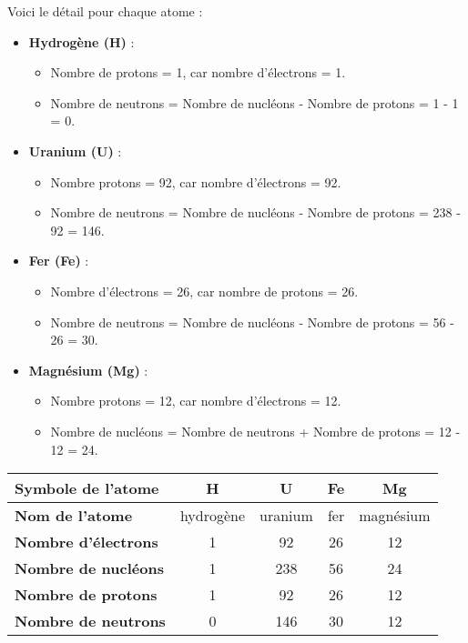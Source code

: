 \documentclass{exam}
\begin{document}
\begin{questions}
Voici le détail pour chaque atome :

\begin{itemize}
  \item \textbf{Hydrogène (H)} : 
  \begin{itemize}
      \item Nombre de protons = 1, car nombre d'électrons = 1.
      \item Nombre de neutrons = Nombre de nucléons - Nombre de protons = 1 - 1 = 0.
  \end{itemize}

    \item \textbf{Uranium (U)} : 
    \begin{itemize}
        \item Nombre protons = 92, car nombre d'électrons = 92.
        \item Nombre de neutrons = Nombre de nucléons - Nombre de protons = 238 - 92 = 146.
    \end{itemize}
    
    \item \textbf{Fer (Fe)} :
    \begin{itemize}
        \item Nombre d'électrons = 26, car nombre de protons = 26.
        \item Nombre de neutrons = Nombre de nucléons - Nombre de protons = 56 - 26 = 30.
    \end{itemize}
    
    \item \textbf{Magnésium (Mg)} :
    \begin{itemize}
        \item Nombre protons = 12, car nombre d'électrons = 12.
        \item Nombre de nucléons = Nombre de neutrons + Nombre de protons = 12 - 12 = 24.
    \end{itemize}
\end{itemize}

\begin{table}[H]
  \centering
  \begin{tabularx}{\textwidth}{|X|c|c|c|c|}
  \hline
  \textbf{Symbole de l’atome} & \textbf{H} & \textbf{U} & \textbf{Fe} & \textbf{Mg} \\
  \hline
  \textbf{Nom de l’atome} & hydrogène & uranium & fer & magnésium \\
  \hline
  \textbf{Nombre d’électrons} & 1 & 92 & 26 & 12 \\
  \hline
  \textbf{Nombre de nucléons} & 1 & 238 & 56 & 24 \\
  \hline
  \textbf{Nombre de protons} & 1 & 92 & 26 & 12 \\
  \hline
  \textbf{Nombre de neutrons} & 0 & 146 & 30 & 12 \\
  \hline
  \end{tabularx}
  \end{table}



\end{questions}
\end{document}
